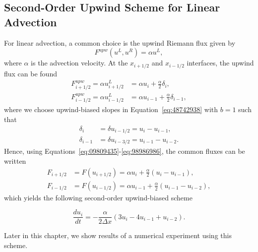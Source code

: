 \subsection{Second-Order Upwind Scheme for Linear Advection}
For linear advection, a common choice is the upwind Riemann flux given by
\begin{equation}
	F^{upw}(u^L, u^R) = \alpha u^L,
	\label{eq:120398}
\end{equation}
where $\alpha$ is the advection velocity. At the $x_{i+1/2}$ and $x_{i-1/2}$ interfaces, the upwind flux can be found
\begin{align}
	F^{upw}_{i+1/2} = \alpha u^L_{i+1/2} &= \alpha u_i + \frac{\alpha}{2}\delta_i, \label{eq:09809435}\\
	F^{upw}_{i-1/2} = \alpha u^L_{i-1/2} &= \alpha u_{i-1} + \frac{\alpha}{2}\delta_{i-1},
\end{align}
where we choose upwind-biased slopes in Equation~\ref{eq:48742938} with $b=1$ such that
\begin{align}
	\delta_i &= \delta u_{i-1/2} = u_i - u_{i-1}, \\
	\delta_{i-1} &= \delta u_{i-3/2} = u_{i-1} - u_{i-2}.
	\label{eq:98986986}
\end{align}
Hence, using Equations~\ref{eq:09809435}-\ref{eq:98986986}, the common fluxes can be written
\begin{align}
	F_{i+1/2} &= F(u_{i+1/2}) = \alpha u_i + \frac{\alpha}{2}\left(u_i-u_{i-1}\right),\\
	F_{i-1/2} &= F(u_{i-1/2}) = \alpha u_{i-1} + \frac{\alpha}{2}\left(u_{i-1}-u_{i-2}\right),
\end{align}
which yields the following second-order upwind-biased scheme
\begin{eqBox}
	\begin{equation}
		\frac{du_i}{dt} = -\frac{\alpha}{2\Delta x}\left(3u_i - 4 u_{i-1} + u_{i-2}\right).
		\label{eq:34290}
	\end{equation}	
\end{eqBox}
Later in this chapter, we show results of a numerical experiment using this scheme.
